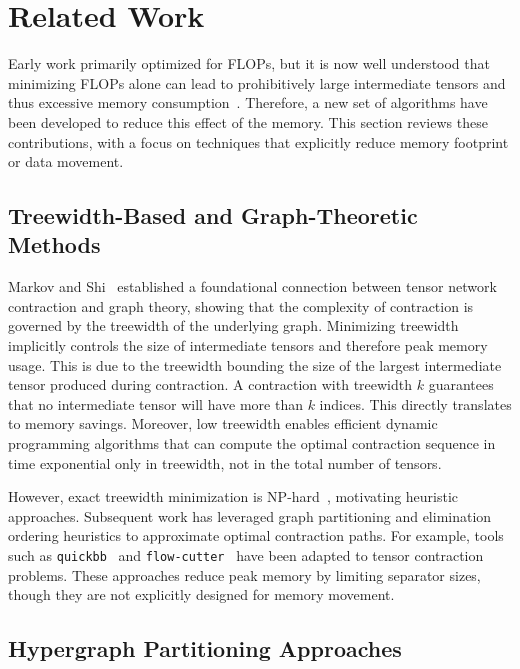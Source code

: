 
\chapter{Related Work}\label{chapter:related_work}

Early work primarily optimized for \ac{FLOP}s, but it is now well understood that minimizing \ac{FLOP}s alone can lead to prohibitively large intermediate tensors and thus excessive memory consumption~\cite{pednault2017pareto}. Therefore, a new set of algorithms have been developed to reduce this effect of the memory. This section reviews these contributions, with a focus on techniques that explicitly reduce memory footprint or data movement.


\section{Treewidth-Based and Graph-Theoretic Methods}

Markov and Shi~\cite{markov2008simulating} established a foundational connection between tensor network contraction and graph theory, showing that the complexity of contraction is governed by the treewidth of the underlying graph. Minimizing treewidth implicitly controls the size of intermediate tensors and therefore peak memory usage. This is due to the treewidth bounding the size of the largest intermediate tensor produced during contraction. A contraction with treewidth $k$ guarantees that no intermediate tensor will have more than $k$ indices. This directly translates to memory savings. Moreover, low treewidth enables efficient dynamic programming algorithms that can compute the optimal contraction sequence in time exponential only in treewidth, not in the total number of tensors.

However, exact treewidth minimization is NP-hard~\cite{dumitrescu2018benchmarking}, motivating heuristic approaches. Subsequent work has leveraged graph partitioning and elimination ordering heuristics to approximate optimal contraction paths. For example, tools such as \texttt{quickbb}~\cite{gogate2012complete} and \texttt{flow-cutter}~\cite{hamann2018graph} have been adapted to tensor contraction problems. These approaches reduce peak memory by limiting separator sizes, though they are not explicitly designed for memory movement.

\section{Hypergraph Partitioning Approaches}

